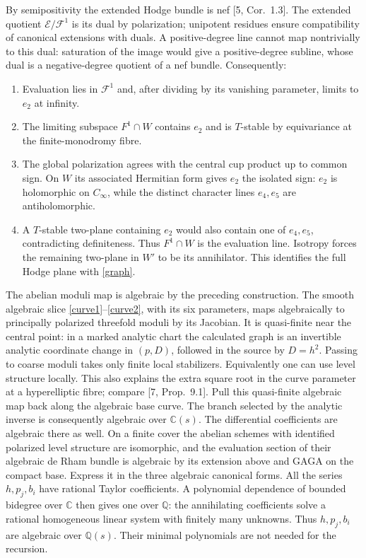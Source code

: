 \documentclass[10pt]{article}
\newcommand{\Q}{\mathbb Q}\newcommand{\C}{\mathbb C}\newcommand{\Z}{\mathbb Z}
\begin{document}
By semipositivity the extended Hodge bundle is nef [5, Cor.~1.3]. The extended quotient $\mathcal E/\mathcal F^1$ is its dual by polarization; unipotent residues ensure compatibility of canonical extensions with duals. A positive-degree line cannot map nontrivially to this dual: saturation of the image would give a positive-degree subline, whose dual is a negative-degree quotient of a nef bundle. Consequently:
\begin{enumerate}
\item Evaluation lies in $\mathcal F^1$ and, after dividing by its vanishing parameter, limits to $e_2$ at infinity.
\item The limiting subspace $F^1\cap W$ contains $e_2$ and is $T$-stable by equivariance at the finite-monodromy fibre.
\item The global polarization agrees with the central cup product up to common sign. On $W$ its associated Hermitian form gives $e_2$ the isolated sign: $e_2$ is holomorphic on $C_\infty$, while the distinct character lines $e_4,e_5$ are antiholomorphic.
\item A $T$-stable two-plane containing $e_2$ would also contain one of $e_4,e_5$, contradicting definiteness. Thus $F^1\cap W$ is the evaluation line. Isotropy forces the remaining two-plane in $W'$ to be its annihilator. This identifies the full Hodge plane with \eqref{graph}.
\end{enumerate}
The abelian moduli map is algebraic by the preceding construction.
The smooth algebraic slice \eqref{curve1}--\eqref{curve2}, with its six parameters, maps algebraically to principally polarized threefold moduli by its Jacobian. It is quasi-finite near the central point: in a marked analytic chart the calculated graph is an invertible analytic coordinate change in $(p,D)$, followed in the source by $D=h^2$. Passing to coarse moduli takes only finite local stabilizers. Equivalently one can use level structure locally. This also explains the extra square root in the curve parameter at a hyperelliptic fibre; compare [7, Prop.~9.1]. Pull this quasi-finite algebraic map back along the algebraic base curve. The branch selected by the analytic inverse is consequently algebraic over $\C(s)$. The differential coefficients are algebraic there as well. On a finite cover the abelian schemes with identified polarized level structure are isomorphic, and the evaluation section of their algebraic de Rham bundle is algebraic by its extension above and GAGA on the compact base. Express it in the three algebraic canonical forms. All the series $h,p_j,b_i$ have rational Taylor coefficients. A polynomial dependence of bounded bidegree over $\C$ then gives one over $\Q$: the annihilating coefficients solve a rational homogeneous linear system with finitely many unknowns. Thus $h,p_j,b_i$ are algebraic over $\Q(s)$. Their minimal polynomials are not needed for the recursion.
\end{document}
